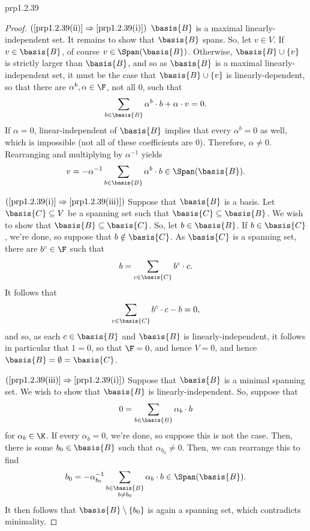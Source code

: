 \begin{prp}{}{prp1.2.39}
\begin{proof}
		\blni
		$(\cref{prp1.2.39(ii)}\Rightarrow \cref{prp1.2.39(i)})$ $\basis{B}$ is a maximal linearly-independent set.  It remains to show that $\basis{B}$ spans.  So, let $v\in V$.  If $v\in \basis{B}$, of course $v\in \Span (\basis{B})$.  Otherwise, $\basis{B}\cup \{ v\}$ is strictly larger than $\basis{B}$, and so as $\basis{B}$ is a maximal linearly-independent set, it must be the case that $\basis{B}\cup \{ v\}$ is linearly-dependent, so that there are $\alpha ^b,\alpha \in \F$, not all $0$, such that
		\begin{equation}
		\sum _{b\in \basis{B}}\alpha ^b\cdot b+\alpha \cdot v=0.
		\end{equation}
		If $\alpha =0$, linear-independent of $\basis{B}$ implies that every $\alpha ^b=0$ as well, which is impossible (not all of these coefficients are $0$).  Therefore, $\alpha \neq 0$.  Rearranging and multiplying by $\alpha ^{-1}$ yields
		\begin{equation}
		v=-\alpha ^{-1}\sum _{b\in \basis{B}}\alpha ^b\cdot b\in \Span (\basis{B}).
		\end{equation}
		
		\blni
		$(\cref{prp1.2.39(i)}\Rightarrow \cref{prp1.2.39(iii)})$ Suppose that $\basis{B}$ is a basis.  Let $\basis{C}\subseteq V$ be a spanning set such that $\basis{C}\subseteq \basis{B}$.  We wish to show that $\basis{B}\subseteq \basis{C}$.  So, let $b\in \basis{B}$.  If $b\in \basis{C}$, we're done, so suppose that $b\notin \basis{C}$.  As $\basis{C}$ is a spanning set, there are $b^c\in \F$ such that
		\begin{equation}
		b=\sum _{c\in \basis{C}}b^c\cdot c.
		\end{equation}
		It follows that
		\begin{equation}
		\sum _{c\in \basis{C}}b^c\cdot c-b=0,
		\end{equation}
		and so, as each $c\in \basis{B}$ and $\basis{B}$ is linearly-independent, it follows in particular that $1=0$, so that $\F =0$, and hence $V=0$, and hence $\basis{B}=\emptyset =\basis{C}$.
		
		\blni
		$(\cref{prp1.2.39(iii)}\Rightarrow \cref{prp1.2.39(i)})$ Suppose that $\basis{B}$ is a minimal spanning set.  We wish to show that $\basis{B}$ is linearly-independent.  So, suppose that
		\begin{equation}
		0=\sum _{b\in \basis{B}}\alpha _b\cdot b
		\end{equation}
		for $\alpha _b\in \K$.  If every $\alpha _b=0$, we're done, so suppose this is not the case.  Then, there is some $b_0\in \basis{B}$ such that $\alpha _{b_0}\neq 0$.  Then, we can rearrange this to find
		\begin{equation}
		b_0=-\alpha _{b_0}^{-1}\sum _{\substack{b\in \basis{B} \\ b\neq b_0}}\alpha _b\cdot b\in \Span (\basis{B}).
		\end{equation}
		It then follows that $\basis{B}\setminus \{ b_0\}$ is again a spanning set, which contradicts minimality.
	\end{proof}
\end{prp}

